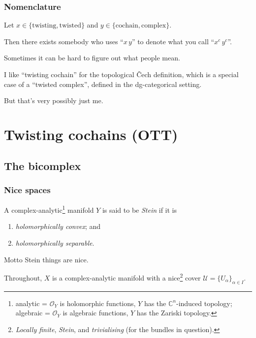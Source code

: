 \documentclass{beamer}
\begin{document}
        \begin{frame}\frametitle{Nomenclature}
            \begin{lemma}
                Let $x\in\{\text{twisting},\text{twisted}\}$ and $y\in\{\text{cochain},\text{complex}\}$.

                Then there exists somebody who uses ``$x\,y$'' to denote what you call ``$x^c\,y^c$''.
            \end{lemma}

            \begin{corollary}
                Sometimes it can be hard to figure out what people mean.
            \end{corollary}
            
            \pause

            I like ``twisting cochain'' for the topological Čech definition, which is a special case of a ``twisted complex'', defined in the dg-categorical setting.

            \pause

            But that's very possibly just me.
        \end{frame}


    \section{Twisting cochains (OTT)}

        \subsection{The bicomplex}

            \begin{frame}\frametitle{Nice spaces}
                \begin{definition}
                    A complex-analytic\footnote{analytic = $\mathcal{O}_Y$ is holomorphic functions, $Y$ has the $\mathbb{C}^n$-induced topology; algebraic = $\mathcal{O}_Y$ is algebraic functions, $Y$ has the Zariski topology.} manifold $Y$ is said to be \emph{Stein} if it is
                    \begin{enumerate}
                        \item \emph{holomorphically convex}; and
                        \item \emph{holomorphically separable}.
                    \end{enumerate}
                \end{definition}

                \pause

                \begin{block}{Motto}
                    Stein things are nice.
                \end{block}

                \pause

                Throughout, $X$ is a complex-analytic manifold with a nice\footnote<3>{\emph{Locally finite}, \emph{Stein}, and \emph{trivialising} (for the bundles in question).} cover $\mathcal{U}=\{U_\alpha\}_{\alpha\in I}$.
            \end{frame}
\end{document}
